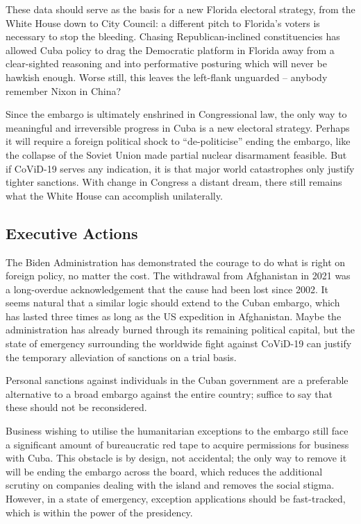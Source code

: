 \documentclass[letterpaper,12pt,twoside]{article} %
\begin{document}
\begin{multicols}{2}
These data should serve as the basis for a new Florida electoral strategy, from the White House down to City Council: a different pitch to Florida's voters is necessary to stop the bleeding. Chasing Republican-inclined constituencies has allowed Cuba policy to drag the Democratic platform in Florida away from a clear-sighted reasoning and into performative posturing which will never be hawkish enough. Worse still, this leaves the left-flank unguarded -- anybody remember Nixon in China?

Since the embargo is ultimately enshrined in Congressional law, the only way to meaningful and irreversible progress in Cuba is a new electoral strategy. Perhaps it will require a foreign political shock to ``de-politicise'' ending the embargo, like the collapse of the Soviet Union made partial nuclear disarmament feasible. But if CoViD-19 serves any indication, it is that major world catastrophes only justify tighter sanctions. With change in Congress a distant dream, there still remains what the White House can accomplish unilaterally.

\subsection*{Executive Actions}

The Biden Administration has demonstrated the courage to do what is right on foreign policy, no matter the cost. The withdrawal from Afghanistan in 2021 was a long-overdue acknowledgement that the cause had been lost since 2002. It seems natural that a similar logic should extend to the Cuban embargo, which has lasted three times as long as the US expedition in Afghanistan. Maybe the administration has already burned through its remaining political capital, but the state of emergency surrounding the worldwide fight against CoViD-19 can justify the temporary alleviation of sanctions on a trial basis.

Personal sanctions against individuals in the Cuban government are a preferable alternative to a broad embargo against the entire country; suffice to say that these should not be reconsidered.

Business wishing to utilise the humanitarian exceptions to the embargo still face a significant amount of bureaucratic red tape to acquire permissions for business with Cuba. This obstacle is by design, not accidental; the only way to remove it will be ending the embargo across the board, which reduces the additional scrutiny on companies dealing with the island and removes the social stigma. However, in a state of emergency, exception applications should be fast-tracked, which is within the power of the presidency.


\end{multicols}
\end{document}
